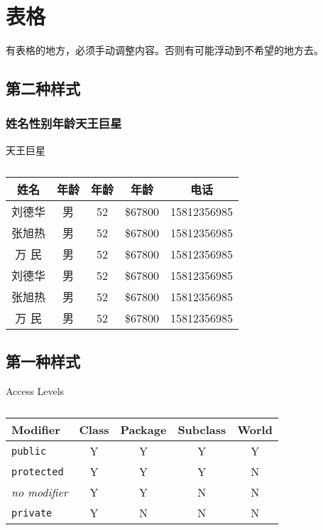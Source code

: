 \clearpage
\section{表格}

有表格的地方，必须手动调整内容。否则有可能浮动到不希望的地方去。

\subsection{第二种样式}

\subsubsection{姓名性别年龄天王巨星}
\begin{table}[!h]
\centering
{}
\caption*{天王巨星}
	\begin{tabular}{*{5}{c}}
	\toprule
	\bfseries 姓名  & \bfseries 年龄 & \bfseries 年龄 & \bfseries 年龄 & \bfseries 电话 \\
	\midrule
	{刘德华}        &{男}            &{52}            &{\${67800}}     &{15812356985}   \\
	{张旭热}        &{男}            &{52}            &{\${67800}}     &{15812356985}   \\
	{万  民}        &{男}            &{52}            &{\${67800}}     &{15812356985}   \\
	{刘德华}        &{男}            &{52}            &{\${67800}}     &{15812356985}   \\
	{张旭热}        &{男}            &{52}            &{\${67800}}     &{15812356985}   \\
	{万  民}        &{男}            &{52}            &{\${67800}}     &{15812356985}   \\
	\bottomrule
	\end{tabular}
\caption{}
\end{table}

\subsection{第一种样式}

\begin{table}[!h]
\centering
{}
\caption*{Access Levels}
	\begin{tabular}{l*{4}{c}}
	\toprule
	\bfseries Modifier   & \bfseries Class & \bfseries Package & \bfseries Subclass & \bfseries World \\
	\midrule
	\texttt{public}      & Y               & Y                 & Y                  & Y               \\
	\texttt{protected}   & Y               & Y                 & Y                  & N               \\
	\itshape no modifier & Y               & Y                 & N                  & N               \\
	\texttt{private}     & Y               & N                 & N                  & N               \\
	\bottomrule
	\end{tabular}
\caption{}
\end{table}

